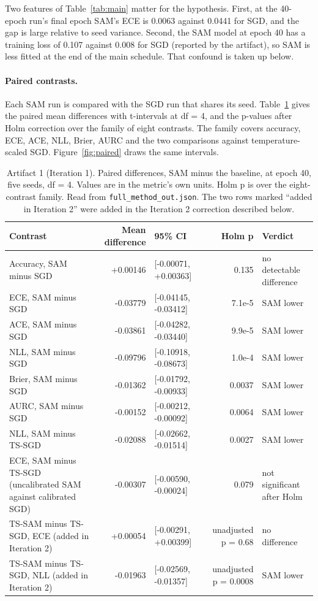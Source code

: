 \documentclass[11pt,letterpaper]{article}
\begin{document}
Two features of Table~\ref{tab:main} matter for the hypothesis. First, at the 40-epoch run's final epoch SAM's ECE is 0.0063 against 0.0441 for SGD, and the gap is large relative to seed variance. Second, the SAM model at epoch 40 has a training loss of 0.107 against 0.008 for SGD (reported by the artifact), so SAM is less fitted at the end of the main schedule. That confound is taken up below.

\paragraph{Paired contrasts.} Each SAM run is compared with the SGD run that shares its seed. Table~\ref{tab:paired} gives the paired mean differences with t-intervals at df = 4, and the p-values after Holm correction over the family of eight contrasts. The family covers accuracy, ECE, ACE, NLL, Brier, AURC and the two comparisons against temperature-scaled SGD. Figure~\ref{fig:paired} draws the same intervals.

\begin{table}[!htbp]
\centering
\footnotesize
\caption{Artifact 1 (Iteration 1). Paired differences, SAM minus the baseline, at epoch 40, five seeds, df = 4. Values are in the metric's own units. Holm p is over the eight-contrast family. Read from \texttt{full\_method\_out.json}. The two rows marked ``added in Iteration 2'' were added in the Iteration 2 correction described below.}
\label{tab:paired}
\begin{tabularx}{\linewidth}{>{\raggedright\arraybackslash}X r l r l}
\toprule
Contrast & Mean difference & 95\% CI & Holm p & Verdict \\
\midrule
Accuracy, SAM minus SGD & +0.00146 & [-0.00071, +0.00363] & 0.135 & no detectable difference \\
ECE, SAM minus SGD & -0.03779 & [-0.04145, -0.03412] & 7.1e-5 & SAM lower \\
ACE, SAM minus SGD & -0.03861 & [-0.04282, -0.03440] & 9.9e-5 & SAM lower \\
NLL, SAM minus SGD & -0.09796 & [-0.10918, -0.08673] & 1.0e-4 & SAM lower \\
Brier, SAM minus SGD & -0.01362 & [-0.01792, -0.00933] & 0.0037 & SAM lower \\
AURC, SAM minus SGD & -0.00152 & [-0.00212, -0.00092] & 0.0064 & SAM lower \\
NLL, SAM minus TS-SGD & -0.02088 & [-0.02662, -0.01514] & 0.0027 & SAM lower \\
ECE, SAM minus TS-SGD (uncalibrated SAM against calibrated SGD) & -0.00307 & [-0.00590, -0.00024] & 0.079 & not significant after Holm \\
TS-SAM minus TS-SGD, ECE (added in Iteration 2) & +0.00054 & [-0.00291, +0.00399] & unadjusted p = 0.68 & no difference \\
TS-SAM minus TS-SGD, NLL (added in Iteration 2) & -0.01963 & [-0.02569, -0.01357] & unadjusted p = 0.0008 & SAM lower \\
\bottomrule
\end{tabularx}
\end{table}
\end{document}
